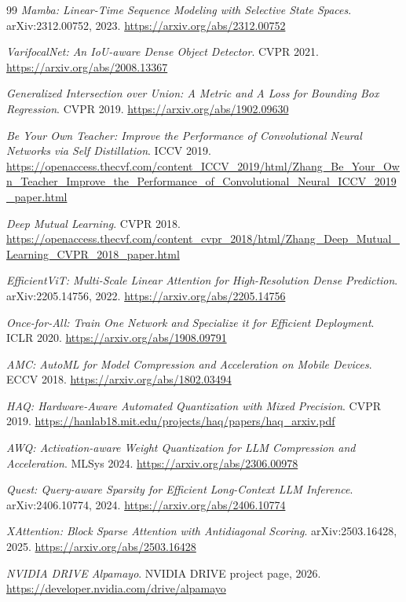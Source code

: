 \documentclass[11pt]{article}
\begin{document}
\begin{thebibliography}{99}
\emph{Mamba: Linear-Time Sequence Modeling with Selective State Spaces}. arXiv:2312.00752, 2023.
\url{https://arxiv.org/abs/2312.00752}

\emph{VarifocalNet: An IoU-aware Dense Object Detector}. CVPR 2021.
\url{https://arxiv.org/abs/2008.13367}

\emph{Generalized Intersection over Union: A Metric and A Loss for Bounding Box Regression}. CVPR 2019.
\url{https://arxiv.org/abs/1902.09630}

\emph{Be Your Own Teacher: Improve the Performance of Convolutional Neural Networks via Self Distillation}. ICCV 2019.
\url{https://openaccess.thecvf.com/content_ICCV_2019/html/Zhang_Be_Your_Own_Teacher_Improve_the_Performance_of_Convolutional_Neural_ICCV_2019_paper.html}

\emph{Deep Mutual Learning}. CVPR 2018.
\url{https://openaccess.thecvf.com/content_cvpr_2018/html/Zhang_Deep_Mutual_Learning_CVPR_2018_paper.html}

\emph{EfficientViT: Multi-Scale Linear Attention for High-Resolution Dense Prediction}. arXiv:2205.14756, 2022.
\url{https://arxiv.org/abs/2205.14756}

\emph{Once-for-All: Train One Network and Specialize it for Efficient Deployment}. ICLR 2020.
\url{https://arxiv.org/abs/1908.09791}

\emph{AMC: AutoML for Model Compression and Acceleration on Mobile Devices}. ECCV 2018.
\url{https://arxiv.org/abs/1802.03494}

\emph{HAQ: Hardware-Aware Automated Quantization with Mixed Precision}. CVPR 2019.
\url{https://hanlab18.mit.edu/projects/haq/papers/haq_arxiv.pdf}

\emph{AWQ: Activation-aware Weight Quantization for LLM Compression and Acceleration}. MLSys 2024.
\url{https://arxiv.org/abs/2306.00978}

\emph{Quest: Query-aware Sparsity for Efficient Long-Context LLM Inference}. arXiv:2406.10774, 2024.
\url{https://arxiv.org/abs/2406.10774}

\emph{XAttention: Block Sparse Attention with Antidiagonal Scoring}. arXiv:2503.16428, 2025.
\url{https://arxiv.org/abs/2503.16428}

\emph{NVIDIA DRIVE Alpamayo}. NVIDIA DRIVE project page, 2026.
\url{https://developer.nvidia.com/drive/alpamayo}


\end{thebibliography}
\end{document}
